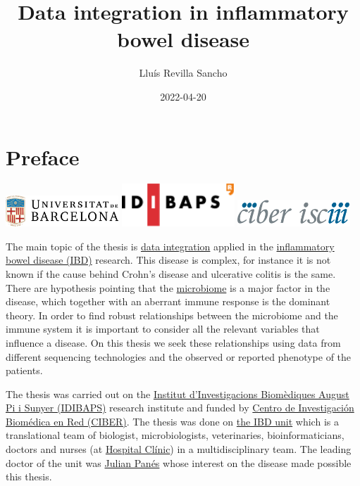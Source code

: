 \documentclass[
  12pt,
  a4paper,
  twoside,
  openright]{book}
\title{Data integration in inflammatory bowel disease}
\author{Lluís Revilla Sancho}
\date{2022-04-20}
\begin{document}
\maketitle

{
\hypersetup{linkcolor=}
\setcounter{tocdepth}{2}
\tableofcontents
}
\listoffigures
\listoftables
\hypertarget{preface}{%
\chapter*{Preface}\label{preface}}

\includegraphics[width=1.66667in,height=\textheight]{images/ub_logo.png} \includegraphics[width=1.66667in,height=\textheight]{images/idibaps_logo.png} \includegraphics[width=1.66667in,height=0.39583in]{images/logo_ciber.png}

The main topic of the thesis is \href{https://en.wikipedia.org/wiki/Data_integration}{data integration} applied in the \href{https://en.wikipedia.org/wiki/Inflammatory_bowel_disease}{inflammatory bowel disease (IBD)} research.
This disease is complex, for instance it is not known if the cause behind Crohn's disease and ulcerative colitis is the same.
There are hypothesis pointing that the \href{https://en.wikipedia.org/wiki/Microbiota}{microbiome} is a major factor in the disease, which together with an aberrant immune response is the dominant theory.
In order to find robust relationships between the microbiome and the immune system it is important to consider all the relevant variables that influence a disease.
On this thesis we seek these relationships using data from different sequencing technologies and the observed or reported phenotype of the patients.

The thesis was carried out on the \href{http://www.idibaps.org/}{Institut d'Investigacions Biomèdiques August Pi i Sunyer (IDIBAPS)} research institute and funded by \href{https://www.ciberehd.org/}{Centro de Investigación Biomédica en Red (CIBER)}.
The thesis was done on \href{https://www.ibd-bcn.org/}{the IBD unit} which is a translational team of biologist, microbiologists, veterinaries, bioinformaticians, doctors and nurses (at \href{https://www.clinicbarcelona.org/en}{Hospital Clínic}) in a multidisciplinary team.
The leading doctor of the unit was \href{https://orcid.org/0000-0002-4971-6902}{Julian Panés} whose interest on the disease made possible this thesis.
\end{document}
